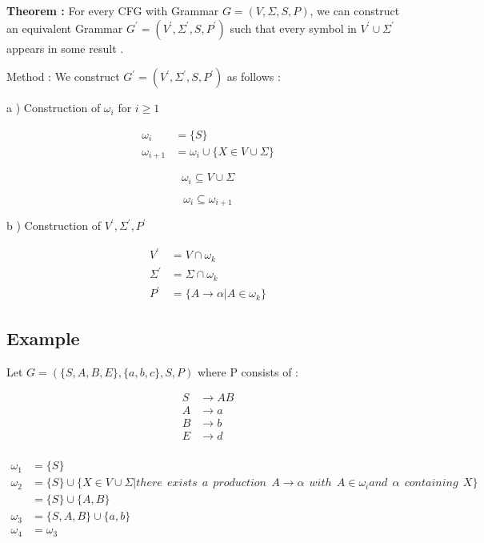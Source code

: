 \documentclass[12pt]{book}
\begin{document}
\textbf{Theorem : } For every CFG with Grammar $ G = (V, \Sigma, S, P)$, we can construct an equivalent Grammar $ G^{\prime} = (V^{\prime}, \Sigma^{\prime}, S, P^{\prime})$ such that every symbol in $V^{\prime} \cup \Sigma^{\prime}$ appears in some result .

Method : We construct $ G^{\prime} = (V^{\prime}, \Sigma^{\prime}, S, P^{\prime})$ as follows :

a ) Construction of $\omega_{i}$ for $i \geq 1$

\begin{align*}
\omega_{i} &= \{ S \} \\
\omega_{i+1} &= \omega_{i} \cup \{ X \in V \cup \Sigma \}
\end{align*}

$$
\omega_{i} \subseteq V \cup \Sigma
$$

$$
\omega_{i} \subseteq \omega_{i+1}
$$

b ) Construction of $V^{\prime} , \Sigma^{\prime} , P^{\prime}$

\begin{align*}
V^{\prime} &= V \cap \omega_{k} \\
\Sigma^{\prime} &= \Sigma \cap \omega_{k} \\
P^{\prime} &= \{ A \to \alpha | A \in \omega_{k} \}
\end{align*}


\subsection{Example}

Let $G = (\{ S, A, B, E \} , \{ a, b, c \}, S, P)$ where P consists of :

\begin{align*}
S &\to AB \\
A &\to a \\
B &\to b \\
E &\to d \\
\end{align*}

\begin{align*}
\omega_{1} &= \{ S \} \\
\omega_{2} &= \{ S \} \cup \{ X \in V \cup \Sigma | there \:\: exists \:\: a \:\: production \:\: A \to \alpha \:\: with \:\: A \in \omega_{i} and \:\: \alpha \:\: containing \:\: X \} \\
&= \{ S \} \cup \{ A, B \} \\
\omega_{3} &= \{ S, A, B \} \cup \{ a, b \} \\
\omega_{4} &= \omega_{3}
\end{align*}
\end{document}
